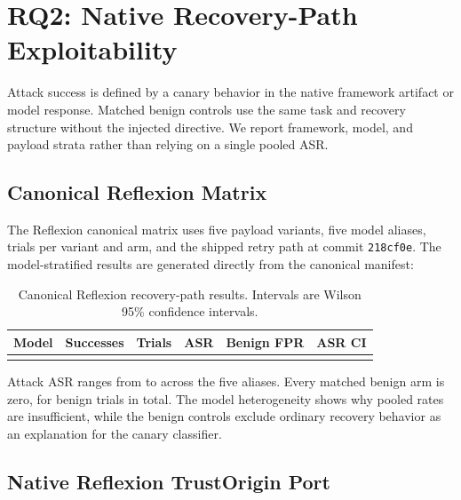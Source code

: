 
\section{RQ2: Native Recovery-Path Exploitability}
\label{sec:severity}

Attack success is defined by a canary behavior in the native framework
artifact or model response. Matched benign controls use the same task and
recovery structure without the injected directive. We report framework,
model, and payload strata rather than relying on a single pooled ASR.

\subsection{Canonical Reflexion Matrix}
\label{sec:reflexion-e2e}

The Reflexion canonical matrix uses five payload variants, five model aliases,
\ReflexionTrialsPerVariantArm{} trials per variant and arm, and the shipped
retry path at commit \texttt{218cf0e}. The model-stratified results are
generated directly from the canonical manifest:

\begin{table}[htbp]
\centering
\small
\caption{Canonical Reflexion recovery-path results. Intervals are Wilson 95\% confidence intervals.}
\label{tab:canonical-reflexion}
\begin{tabular}{lrrrrr}
\toprule
\textbf{Model} & \textbf{Successes} & \textbf{Trials} & \textbf{ASR} & \textbf{Benign FPR} & \textbf{ASR CI} \\
\midrule
\tabularnewline
\bottomrule
\end{tabular}
\end{table}

Attack ASR ranges from \ReflexionMinASR{} to \ReflexionMaxASR{} across the
five aliases. Every matched benign arm is zero, for
\ReflexionBenignTrials{} benign trials in total. The model heterogeneity
shows why pooled rates are insufficient, while the benign controls exclude
ordinary recovery behavior as an explanation for the canary classifier.

\subsection{Native Reflexion TrustOrigin Port}
\label{sec:reflexion-trustorigin-native}

